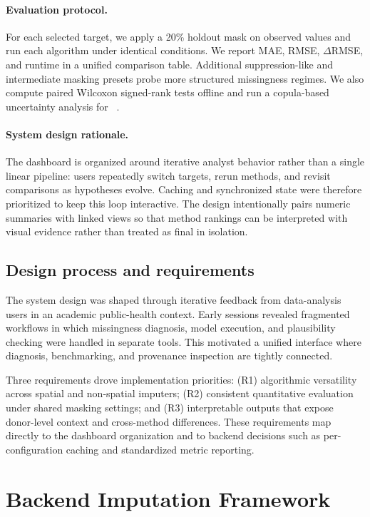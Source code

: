 \paragraph*{Evaluation protocol.}
For each selected target, we apply a 20\% holdout mask on observed values and run each algorithm under identical conditions. We report MAE, RMSE, \(\Delta\)RMSE, and runtime in a unified comparison table. Additional suppression-like and intermediate masking presets probe more structured missingness regimes. We also compute paired Wilcoxon signed-rank tests offline and run a copula-based uncertainty analysis for \gknn~\cite{nelsen2006introduction,joe2014dependence,hollenbach2021multiple}.

\paragraph*{System design rationale.}
The dashboard is organized around iterative analyst behavior rather than a single linear pipeline: users repeatedly switch targets, rerun methods, and revisit comparisons as hypotheses evolve. Caching and synchronized state were therefore prioritized to keep this loop interactive. The design intentionally pairs numeric summaries with linked views so that method rankings can be interpreted with visual evidence rather than treated as final in isolation.

\subsection{Design process and requirements}
The system design was shaped through iterative feedback from data-analysis users in an academic public-health context. Early sessions revealed fragmented workflows in which missingness diagnosis, model execution, and plausibility checking were handled in separate tools. This motivated a unified interface where diagnosis, benchmarking, and provenance inspection are tightly connected.

Three requirements drove implementation priorities: (R1) algorithmic versatility across spatial and non-spatial imputers; (R2) consistent quantitative evaluation under shared masking settings; and (R3) interpretable outputs that expose donor-level context and cross-method differences. These requirements map directly to the dashboard organization and to backend decisions such as per-configuration caching and standardized metric reporting.

\section{Backend Imputation Framework}
